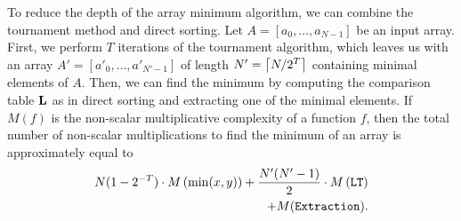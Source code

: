 	To reduce the depth of the array minimum algorithm, we can combine the tournament method and direct sorting.
	Let $A = [a_0,\dots,a_{N-1}]$ be an input array.
	First, we perform $T$ iterations of the tournament algorithm, which leaves us with an array $A' = [a'_0, \dots, a'_{N'-1}]$ of length $N' = \left\lceil N/2^T \right\rceil$ containing minimal elements of $A$.
	Then, we can find the minimum by computing the comparison table $\mathbf{L}$ as in direct sorting and extracting one of the minimal elements.
	If $M(f)$ is the non-scalar multiplicative complexity of a function $f$, then the total number of non-scalar multiplications to find the minimum of an array is approximately equal to
	\begin{align*}
		N(1 - 2^{-T}) \cdot M\left(\min(x,y)\right) + \frac{N'(N'-1)}{2} \cdot M\left(\mathtt{LT}\right) \\
		+ M(\mathtt{Extraction}).
	\end{align*}
	
